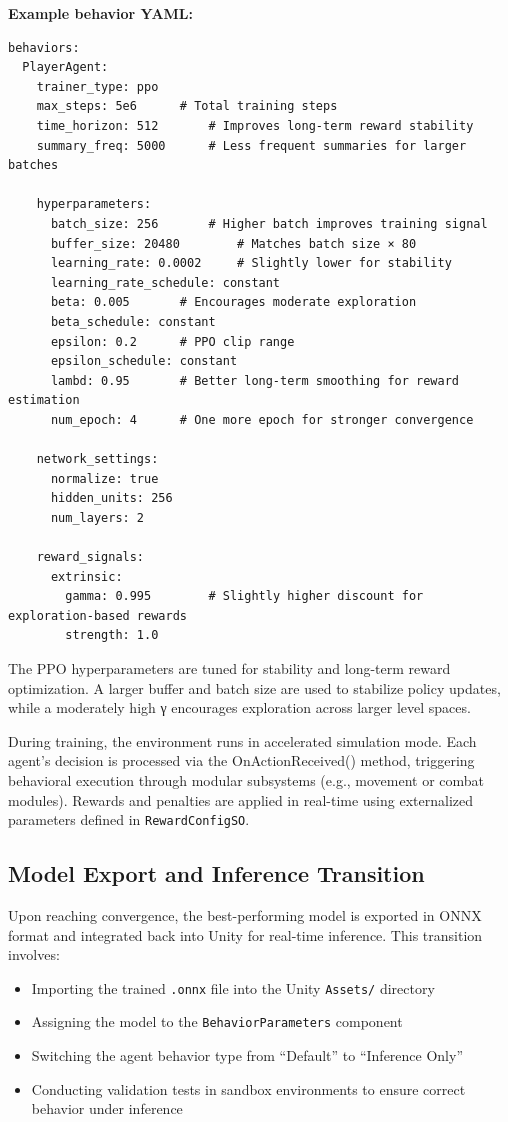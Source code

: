 \documentclass[12pt,oneside,openright,a4paper]{cpe-english-project}
\begin{document}
\textbf{Example behavior YAML:}
\begin{lstlisting}
behaviors:
  PlayerAgent:
    trainer_type: ppo
    max_steps: 5e6		# Total training steps
    time_horizon: 512		# Improves long-term reward stability
    summary_freq: 5000		# Less frequent summaries for larger batches

    hyperparameters:
      batch_size: 256		# Higher batch improves training signal
      buffer_size: 20480		# Matches batch size × 80
      learning_rate: 0.0002		# Slightly lower for stability
      learning_rate_schedule: constant
      beta: 0.005		# Encourages moderate exploration
      beta_schedule: constant
      epsilon: 0.2		# PPO clip range
      epsilon_schedule: constant
      lambd: 0.95		# Better long-term smoothing for reward estimation
      num_epoch: 4		# One more epoch for stronger convergence

    network_settings:
      normalize: true
      hidden_units: 256
      num_layers: 2

    reward_signals:
      extrinsic:
        gamma: 0.995		# Slightly higher discount for exploration-based rewards
        strength: 1.0
\end{lstlisting}

The PPO hyperparameters are tuned for stability and long-term reward optimization. A larger buffer and batch size are used to stabilize policy updates, while a moderately high γ encourages exploration across larger level spaces.

During training, the environment runs in accelerated simulation mode. Each agent’s decision is processed via the OnActionReceived() method, triggering behavioral execution through modular subsystems (e.g., movement or combat modules). Rewards and penalties are applied in real-time using externalized parameters defined in \texttt{RewardConfigSO}.

\subsection{Model Export and Inference Transition}

Upon reaching convergence, the best-performing model is exported in ONNX format and integrated back into Unity for real-time inference. This transition involves:

\begin{itemize}
\item Importing the trained \texttt{.onnx} file into the Unity \texttt{Assets/} directory
\item Assigning the model to the \texttt{BehaviorParameters} component
\item Switching the agent behavior type from “Default” to “Inference Only”
\item Conducting validation tests in sandbox environments to ensure correct behavior under inference
\end{itemize}
\end{document}
